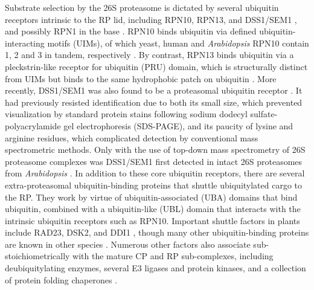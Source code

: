 	Substrate selection by the 26S proteasome is dictated by several ubiquitin receptors intrinsic to the RP lid, including RPN10, RPN13, and DSS1/SEM1 \citep{fatimababy10, finley09, lin11, paraskevopoulos14, sakata12, van96}, and possibly RPN1 in the base \citep{elsasser02}.  RPN10 binds ubiquitin via defined ubiquitin-interacting motifs (UIMs), of which yeast, human and \textit{Arabidopsis} RPN10 contain 1, 2 and 3 in tandem, respectively \citep{fatimababy10, finley09, fu98, lin11, van96}.  By contrast, RPN13 binds ubiquitin via a pleckstrin-like receptor for ubiquitin (PRU) domain, which is structurally distinct from UIMs but binds to the same hydrophobic patch on ubiquitin \citep{husnjak08, schreiner08}.  More recently, DSS1/SEM1 was also found to be a proteasomal ubiquitin receptor \citep{paraskevopoulos14}.  It had previously resisted identification due to both its small size, which prevented visualization by standard protein stains following sodium dodecyl sulfate-polyacrylamide gel electrophoresis (SDS-PAGE), and its paucity of lysine and arginine residues, which complicated detection by conventional mass spectrometric methods.  Only with the use of top-down mass spectrometry of 26S proteasome complexes was DSS1/SEM1 first detected in intact 26S proteasomes from \textit{Arabidopsis} \citep{russell13}.  
	In addition to these core ubiquitin receptors, there are several extra-proteasomal ubiquitin-binding proteins that shuttle ubiquitylated cargo to the RP.  They work by virtue of ubiquitin-associated (UBA) domains that bind ubiquitin, combined with a ubiquitin-like (UBL) domain that interacts with the intrinsic ubiquitin receptors such as RPN10.  Important shuttle factors in plants include RAD23, DSK2, and DDI1 \citep{farmer10, fatimababy10, finley09, lin11}, though many other ubiquitin-binding proteins are known in other species \citep{husnjak12}.  Numerous other factors also associate sub-stoichiometrically with the mature CP and RP sub-complexes, including deubiquitylating enzymes, several E3 ligases and protein kinases, and a collection of protein folding chaperones \citep{besche14, book10, leggett02, xie00}.
